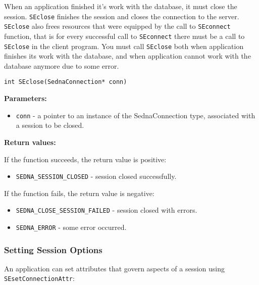 \documentclass[a4paper,12pt]{article}
\newenvironment{citemize}
{\begin{itemize}
  \setlength{\itemsep}{0pt}
  \setlength{\parskip}{0pt}
  \setlength{\parsep}{0pt}}
{\end{itemize}}
\begin{document}
When an application finished it's work with the database, it must close the
session. \verb!SEclose! finishes the session and closes the connection to the
server. \verb!SEclose! also frees resources that were equipped by the call to
\verb!SEconnect! function, that is for every successful call to \verb!SEconnect!
there must be a call to \verb!SEclose! in the client program. You must call
\verb!SEclose! both when application finishes its work with the database, and
when application cannot work with the database anymore due to some error.

\begin{verbatim}
int SEclose(SednaConnection* conn)
\end{verbatim}

\noindent
\textbf{Parameters:}

\begin{citemize}
\item\verb!conn! - a pointer to an instance of the SednaConnection type,
associated with a session to be closed.
\end{citemize}

\noindent
\textbf{Return values:}

\medskip

\noindent
If the function succeeds, the return value is positive:

\begin{citemize}
\item\verb!SEDNA_SESSION_CLOSED! - session closed successfully.
\end{citemize}

\noindent
If the function fails, the return value is negative:

\begin{citemize}
\item\verb!SEDNA_CLOSE_SESSION_FAILED! - session closed with errors.
\item\verb!SEDNA_ERROR! - some error occurred.
\end{citemize}


\subsubsection{Setting Session Options}
\label{session-option-capi}

An application can set attributes that govern aspects of a session using
\verb!SEsetConnectionAttr!:
\end{document}
